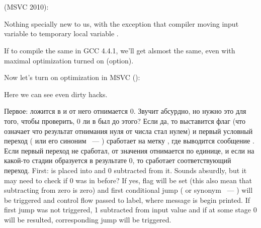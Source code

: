 ﻿\section{\SwitchCaseDefaultSectionName}

\subsection{}



 (MSVC 2010):



{Nothing specially new to us, with the exception that compiler moving input variable 
 to temporary local variable .}

{If to compile the same in GCC 4.4.1, we'll get alsmost the same, even with maximal optimization 
turned on (\Othree option).}

{Now let's turn on optimization in} MSVC (\Ox): 



{Here we can see even dirty hacks.}

\IFRU
{Первое:  ложится в \EAX и от него отнимается 0. Звучит абсурдно, но нужно это для того, чтобы проверить, 
0 ли в \EAX был до этого? Если да, то выставится флаг \ZF (что означает что результат отнимания нуля от числа 
стал нулем) и первый условный переход \JE ( или его синоним \JZ ~--- ) 
сработает на метку , где выводится сообщение .
Если первый переход не сработал, от значения отнимается по единице, 
и если на какой-то стадии образуется в результате 0, то сработает соответствующий переход.}
{First:  is placed into \EAX and 0 subtracted from it. Sounds absurdly, but it may need to check if 
0 was in \EAX before? If yes, flag \ZF will be set (this also mean that subtracting from zero is zero) 
and first conditional jump \JE ( or synonym \JZ ~--- ) will be triggered 
and control flow passed to  label, where  message is begin printed. 
If first jump was not triggered, 1 subtracted from input value and if at some stage 0 will be resulted, 
corresponding jump will be triggered.}


